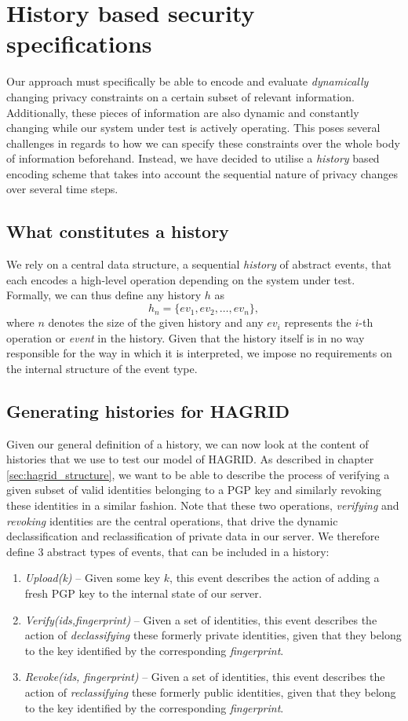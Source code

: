 \section{History based security specifications}
\label{sec:history_def}
Our approach must specifically be able to encode and evaluate \emph{dynamically} changing privacy constraints on a certain subset of relevant information. Additionally, these pieces of information are also dynamic and constantly changing while our system under test is actively operating. This poses several challenges in regards to how we can specify these constraints over the whole body of information beforehand. 
Instead, we have decided to utilise a \emph{history} based encoding scheme that takes into account the sequential nature of privacy changes over several time steps.
\subsection{What constitutes a history}
We rely on a central data structure, a sequential \emph{history} of abstract events, that each encodes a high-level operation depending on the system under test.
Formally, we can thus define any history \(h\) as
\[
    h_n = \{ev_1,ev_2,\dots, ev_n\},
\]
where \(n\) denotes the size of the given history and any \(ev_i\) represents the \(i\)-th operation or \emph{event} in the history.
Given that the history itself is in no way responsible for the way in which it is interpreted, we impose no requirements on the internal structure of the event type.
\subsection{Generating histories for HAGRID}
Given our general definition of a history, we can now look at the content of histories that we use to test our model of HAGRID. 
As described in chapter \ref{sec:hagrid_structure}, we want to be able to describe the process of verifying a given subset of valid identities belonging to a PGP key and similarly revoking these identities in a similar fashion. Note that these two operations, \emph{verifying} and \emph{revoking} identities are the central operations, that drive the dynamic declassification and reclassification of private data in our server.
We therefore define 3 abstract types of events, that can be included in a history: 
\begin{enumerate}
    \item \emph{Upload(k)} -- Given some key \(k\), this event describes the action of adding a fresh PGP key to the internal state of our server.
    \item \emph{Verify(ids,fingerprint)} -- Given a set of identities, this event describes the action of \emph{declassifying} these formerly private identities, given that they belong to the key identified by the corresponding \emph{fingerprint}.
    \item \emph{Revoke(ids, fingerprint)} -- Given a set of identities, this event describes the action of \emph{reclassifying} these formerly public identities, given that they belong to the key identified by the corresponding \emph{fingerprint}.
\end{enumerate}

